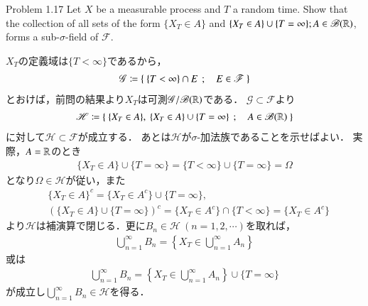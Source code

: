 \begin{itembox}[l]{Problem 1.17}
	Let $X$ be a measurable process and $T$ a random time. Show that 
	the collection of all sets of the form $\{X_T \in A\}$ and 
	$\{X_T \in A\} \cup \{T = \infty\};A \in \mathscr{B}(\mathbb{R})$, forms a 
	sub-$\sigma$-field of $\mathscr{F}$.
\end{itembox}

\begin{prf}
	$X_T$の定義域は$\{T<\infty\}$であるから，
	\begin{align}
		\mathscr{G} \coloneqq \left\{\ \{T < \infty\} \cap E\ \, ; \quad E \in \mathscr{F}\ \right\}
	\end{align}
	とおけば，前問の結果より$X_T$は可測$\mathscr{G}/\mathscr{B}(\mathbb{R})$である．
	$\mathscr{G} \subset \mathscr{F}$より
	\begin{align}
		\mathscr{H} \coloneqq \left\{\ \{X_T \in A\},\ \{X_T \in A\} \cup \{T = \infty\}\ \, ; \quad A \in \mathscr{B}(\mathbb{R})\ \right\}
	\end{align}
	に対して$\mathscr{H} \subset \mathscr{F}$が成立する．
	あとは$\mathscr{H}$が$\sigma$-加法族であることを示せばよい．
	実際，$A = \mathbb{R}$のとき
	\begin{align}
		\{X_T \in A\} \cup \{T = \infty\} = \{T < \infty\} \cup \{T = \infty\} = \Omega
	\end{align}
	となり$\Omega \in \mathscr{H}$が従い，また
	\begin{align}
		&\{X_T \in A\}^c = \{X_T \in A^c\} \cup \{T = \infty\}, \\
		&\left( \{X_T \in A\} \cup \{T = \infty\} \right)^c
		=  \{X_T \in A^c\} \cap \{T < \infty\}
		= \{X_T \in A^c\}
	\end{align}
	より$\mathscr{H}$は補演算で閉じる．更に$B_n \in \mathscr{H}\ (n=1,2,\cdots)$を取れば，
	\begin{align}
		\bigcup_{n=1}^{\infty} B_n = \left\{X_T \in \bigcup_{n=1}^{\infty} A_n \right\}
	\end{align}
	或は
	\begin{align}
		\bigcup_{n=1}^{\infty} B_n = \left\{X_T \in \bigcup_{n=1}^{\infty} A_n \right\} \cup \{T = \infty\}
	\end{align}
	が成立し$\bigcup_{n=1}^\infty B_n \in \mathscr{H}$を得る．
	\QED
\end{prf}